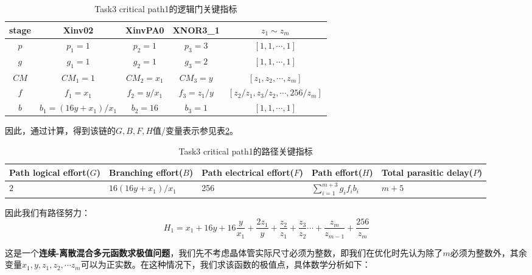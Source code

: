 \documentclass[UTF8,12pt,a4paper]{ctexart}
\begin{document}
\begin{table}[htbp]
    \centering
    \caption{Task3 critical path1的逻辑门关键指标}
    \label{tab:task3_p1_metrics}
    \begin{tabular}{ccccc}
    \toprule
    stage & Xinv02 & XinvPA0 & XNOR3\_1 & $z_1 \sim z_m$ \\
    \midrule
    $p$ & $p_1 = 1$ & $p_2 = 1$ & $p_3 = 3$ & $[1,1,\cdots ,1]$ \\
    $g$ & $g_1 = 1$ & $g_2 = 1$ & $g_3 = 2$ & $[1,1,\cdots ,1]$ \\
    $CM$ & $CM_1 = 1$ & $CM_2 = x_1$ & $CM_3 = y$ & $[z_1, z_2, \cdots, z_m]$ \\
    $f$ & $f_1 = x_1$ & $f_2 = y/x_1$ & $f_3 = z_{1}/y$ & $[z_{2}/z_{1}, z_{3}/z_{2}, \cdots, 256/z_{m}]$ \\
    $b$ & $b_1 = (16y+x_1)/x_1$ & $b_2 = 16$ & $b_3 = 1$ & $[1,1,\cdots ,1]$ \\
    \bottomrule
    \end{tabular}
\end{table}

因此，通过计算，得到该链的$G,B,F,H$值/变量表示参见表\ref{tab:task3_p1_path_metrics}。

\begin{table}[htbp]
    \centering
    \caption{Task3 critical path1的路径关键指标}
    \label{tab:task3_p1_path_metrics}
    \begin{tabularx}{\linewidth}{XXXXX}
    \toprule
    Path logical effort($G$) & Branching effort($B$) &
    Path electrical effort($F$) & Path effort($H$) &
    Total parasitic delay($P$) \\
    \midrule
    $2$ & $16(16y+x_1)/x_1$ & 256 & $\sum_{i=1}^{m+3}{g_i f_i b_i}$ & $m+5$ \\
    \bottomrule
    \end{tabularx}
\end{table}

因此我们有路径努力：
$$H_1 = x_1 + 16y + 16\frac{y}{x_1} + \frac{2z_1}{y} + \frac{z_2}{z_1} + \frac{z_3}{z_2} \cdots + \frac{z_m}{z_{m-1}} + \frac{256}{z_m}$$

这是一个\textbf{连续-离散混合多元函数求极值问题}，我们先不考虑晶体管实际尺寸必须为整数，即我们在优化时先认为除了$m$必须为整数外，其余变量$x_1, y, z_1, z_2, \cdots z_m$可以为正实数。在这种情况下，我们求该函数的极值点，具体数学分析如下：
\end{document}

